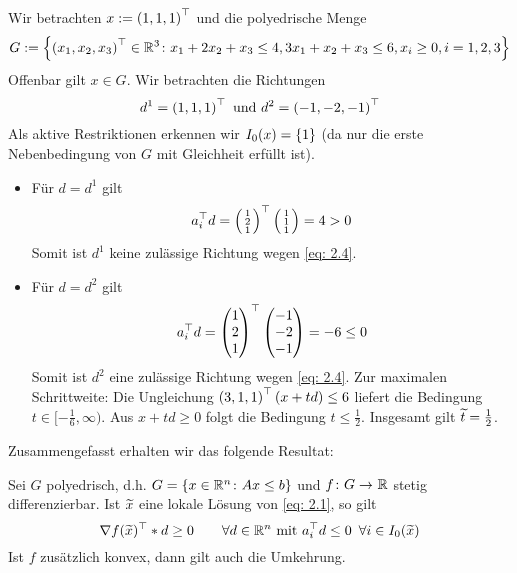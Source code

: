 \begin{beispiel} %
	Wir betrachten $x \mathrel{:=} \left( 1,1,1 \right)^{\top}$ und die polyedrische Menge
	\begin{equation*}
		 G \mathrel{:=} \left\{ \left( x_1,x_2,x_3 \right)^{\top} \in \mathbb{R}^3 \colon x_1 + 2x_2 + x_3 \le 4, 3x_1 + x_2 + x_3 \le 6, x_i \ge 0, i=1,2,3 \right\}
	\end{equation*}
	Offenbar gilt $x \in G$. Wir betrachten die Richtungen
	\begin{equation*}
		d^1 = \left( 1,1,1 \right)^{\top} \text{ und } d^2 = \left( -1,-2,-1 \right)^{\top}
	\end{equation*}
	Als aktive Restriktionen erkennen wir $I_0(x) = \left\{ 1 \right\}$ (da nur die erste Nebenbedingung von $G$ mit Gleichheit erfüllt ist).
	\begin{itemize}
		\item Für $d = d^1$ gilt
		\begin{equation*}
			a_i^{\top} d = \left( \begin{smallmatrix} 1 \\ 2 \\ 1	\end{smallmatrix} \right)^{\top} \left(\begin{smallmatrix} 1 \\ 1 \\ 1 \end{smallmatrix}\right) = 4 > 0
		\end{equation*}
		Somit ist $d^1$ keine zulässige Richtung wegen \eqref{eq: 2.4}.
		\item Für $d = d^2$ gilt
		\begin{equation*}
		a_i^{\top} d = \begin{pmatrix} 1 \\ 2 \\ 1	\end{pmatrix}^{\top} \begin{pmatrix} -1 \\ -2 \\ -1 \end{pmatrix} = -6 \le 0
		\end{equation*}
		Somit ist $d^2$ eine zulässige Richtung wegen \eqref{eq: 2.4}. Zur maximalen Schrittweite: Die Ungleichung $\left( 3,1,1 \right)^{\top}(x + td) \le 6$ liefert die Bedingung $t \in [-\frac{1}{6}, \infty)$. Aus $x+td \ge 0$ folgt die Bedingung $t \le \frac{1}{2}$. Insgesamt gilt $\widetilde{t} = \frac{1}{2}$.
	\end{itemize} 
\end{beispiel}

Zusammengefasst erhalten wir das folgende Resultat:

\begin{folgerung} %
	Sei $G$ polyedrisch, d.h. $G = \left\{ x \in \mathbb{R}^n \colon Ax \le b \right\}$ und $\abb{f}{G}{\R}$ stetig differenzierbar. Ist $\widetilde{x}$ eine lokale Lösung von \eqref{eq: 2.1}, so gilt 
	\begin{equation}
		\nabla f(\widetilde{x})^{\top} * d \ge 0 \qquad \forall d \in \mathbb{R}^n  \text{ mit } a_i^{\top} d \le 0 \enskip \forall i \in I_0(\widetilde{x}) \label{eq: 2.6}
	\end{equation}
	Ist $f$ zusätzlich konvex, dann gilt auch die Umkehrung.
\end{folgerung}